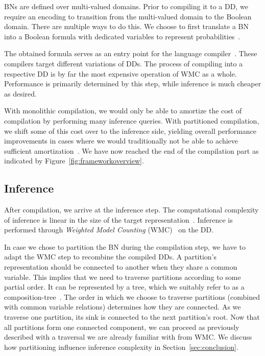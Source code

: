 BNs are defined over multi-valued domains. Prior to compiling it to a DD, we require an encoding to transition from the multi-valued domain to the Boolean domain. There are multiple ways to do this. We choose to first translate a BN into a Boolean formula with dedicated variables to represent probabilities~\cite{chavira2008probabilistic,dal2017wpbdd}.

The obtained formula serves as an entry point for the language compiler~\cite{dudek2020addmc}. These compilers target different variations of DDs. The process of compiling into a respective DD is by far the most expensive operation of WMC as a whole. Performance is primarily determined by this step, while inference is much cheaper as desired.

With monolithic compilation, we would only be able to amortize the cost of compilation by performing many inference queries. With partitioned compilation, we shift some of this cost over to the inference side, yielding overall performance improvements in cases where we would traditionally not be able to achieve sufficient amortization~\cite{dal2017reducing}. We have now reached the end of the compilation part as indicated by Figure~\ref{fig:frameworkoverview}.

\subsection{Inference}\label{subsec:inference}

After compilation, we arrive at the inference step. The computational complexity of inference is linear in the size of the target representation~\cite{darwiche2002knowledge}. Inference is performed through \emph{Weighted Model Counting} (WMC)~\cite{chavira2008probabilistic,darwiche2021quantifying} on the DD.

In case we chose to partition the BN during the compilation step, we have to adapt the WMC step to recombine the compiled DDs. A partition's representation should be connected to another when they share a common variable. This implies that we need to traverse partitions according to some partial order. It can be represented by a tree, which we suitably refer to as a composition-tree~\cite{dal2021compositional}. The order in which we choose to traverse partitions  (combined with common variable relations) determines how they are connected. As we traverse one partition, its sink is connected to the next partition's root. Now that all partitions form one connected component, we can proceed as previously described with a traversal we are already familiar with from WMC. We discuss how partitioning influence inference complexity in Section~\ref{sec:conclusion}.

